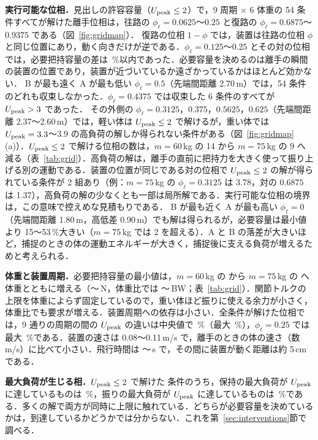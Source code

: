 \textbf{実行可能な位相．}見出しの許容容量（$U_{\mathrm{peak}}\le2$）で，9 周期 $\times$ 6 体重の 54 条件すべてが解けた離手位相は，往路の $\phi_\ell=0.0625$〜$0.25$ と復路の $\phi_\ell=0.6875$〜$0.9375$ である（図~\ref{fig:gridmap}）．
復路の位相 $1-\phi$ では，装置は往路の位相 $\phi$ と同じ位置にあり，動く向きだけが逆である．$\phi_\ell=0.125$〜$0.25$ とその対の位相では，必要把持容量の差は \mirrorMax\,\%以内であった．必要容量を決めるのは離手の瞬間の装置の位置であり，装置が近づいているか遠ざかっているかはほとんど効かない．
B が最も遠く A が最も低い $\phi_\ell=0.5$（先端間距離 2.70\,m）では，54 条件のどれも収束しなかった．$\phi_\ell=0.4375$ では収束した 6 条件のすべてが $U_{\mathrm{peak}}>3$ であった．
その外側の $\phi_\ell=0.3125$，$0.375$，$0.5625$，$0.625$（先端間距離 2.37〜2.60\,m）では，軽い体は $U_{\mathrm{peak}}\le2$ で解けるが，重い体では $U_{\mathrm{peak}}=3.3$〜$3.9$ の高負荷の解しか得られない条件がある（図~\ref{fig:gridmap}(a)）．$U_{\mathrm{peak}}\le2$ で解ける位相の数は，$m=60$\,kg の 14 から $m=75$\,kg の 9 へ減る（表~\ref{tab:grid}）．高負荷の解は，離手の直前に把持力を大きく使って振り上げる別の運動である．装置の位置が同じである対の位相で $U_{\mathrm{peak}}\le2$ の解が得られている条件が 2 組あり（例：$m=75$\,kg の $\phi_\ell=0.3125$ は 3.78，対の $0.6875$ は 1.37），高負荷の解の少なくとも一部は局所解である．実行可能な位相の境界は，この意味で控えめな見積もりである．
B が最も近く A が最も高い $\phi_\ell=0$（先端間距離 1.80\,m，高低差 0.90\,m）でも解は得られるが，必要容量は最小値より 15〜53\,\%大きい（$m=75$\,kg では 2 を超える）．A と B の落差が大きいほど，捕捉のときの体の運動エネルギーが大きく，捕捉後に支える負荷が増えるためと考えられる．

\textbf{体重と装置周期．}必要把持容量の最小値は，$m=60$\,kg の \capSixty から $m=75$\,kg の \capSeventyFive へ体重とともに増える（\capNmin〜\capNmax\,N，体重比では \capBWmin〜\capBWmax\,BW；表~\ref{tab:grid}）．関節トルクの上限を体重によらず固定しているので，重い体ほど振りに使える余力が小さく，体重比でも要求が増える．装置周期への依存は小さい．全条件が解けた位相では，9 通りの周期の間の $U_{\mathrm{peak}}$ の違いは中央値で \periodSpreadMed\,\%（最大 \periodSpreadMax\,\%），$\phi_\ell=0.25$ では最大 \periodSpreadQuarterMax\,\%である．装置の速さは 0.08〜0.11\,m/s で，離手のときの体の速さ（数 m/s）に比べて小さい．飛行時間は \flightMin〜\flightMax\,s で，その間に装置が動く距離は約 5\,cm である．

\textbf{最大負荷が生じる相．}$U_{\mathrm{peak}}\le2$ で解けた \gridFeasTwo 条件のうち，保持の最大負荷が $U_{\mathrm{peak}}$ に達しているものは \holdAtPeak\,\%，振りの最大負荷が $U_{\mathrm{peak}}$ に達しているものは \swingAtPeak\,\%である．多くの解で両方が同時に上限に触れている．どちらが必要容量を決めているかは，到達しているかどうかでは分からない．これを第~\ref{sec:interventions}節で調べる．
